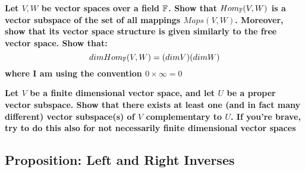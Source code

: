 \documentclass{exam}
\begin{document}
\begin{questions}

\question \textbf{Let $V,W$ be vector spaces over a field $\mathbb{F}$. Show that $Hom_{\mathbb{F}}(V,W)$ is a vector subspace of the set of all
mappings $Maps(V,W)$. Moreover, show that its vector space structure is given similarly to the free vector space. Show that:
\[
dim Hom_{\mathbb{F}}(V,W) = (dim V)(dimW)
\]
where I am using the convention $0 \times \infty = 0$}

\question \textbf{Let $V$ be a finite dimensional vector space, and let $U$ be a proper vector subspace. Show that there
exists at least one (and in fact many different) vector subspace(s) of $V$ complementary to $U$. If you’re brave, try to do
this also for not necessarily finite dimensional vector spaces}

\end{questions}

\subsection{Proposition: Left and Right Inverses}

\end{document}
